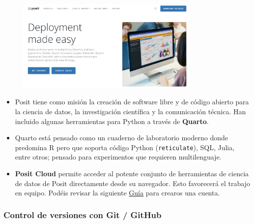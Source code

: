 \documentclass[
  letterpaper,
  DIV=11,
  numbers=noendperiod]{scrreprt}
\begin{document}
\begin{figure}

{\centering \includegraphics[width=0.8\textwidth,height=\textheight]{Figuras/posit.JPG}

}

\end{figure}

\begin{itemize}
\item
  Posit tiene como misión la creación de software libre y de código
  abierto para la ciencia de datos, la investigación científica y la
  comunicación técnica. Han incluido algunas herramientas para Python a
  través de \textbf{Quarto}.
\item
  Quarto está pensado como un cuaderno de laboratorio moderno donde
  predomina R pero que soporta código Python (\texttt{reticulate}), SQL,
  Julia, entre otros; pensado para experimentos que requieren
  multilenguaje.
\item
  \textbf{Posit Cloud} permite acceder al potente conjunto de
  herramientas de ciencia de datos de Posit directamente desde su
  navegador. Esto favorecerá el trabajo en equipo. Podéis revisar la
  siguiente \href{https://posit.cloud/learn/guide}{Guía} para crearos
  una cuenta.
\end{itemize}

\hypertarget{control-de-versiones-con-git-github}{%
\subsubsection{Control de versiones con Git /
GitHub}\label{control-de-versiones-con-git-github}}
\end{document}
